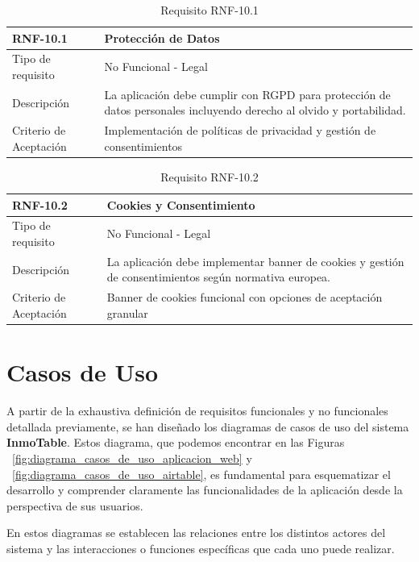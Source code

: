 
\begin{table}[H]
\centering
\begin{tabular}{|p{3cm}|p{10cm}|}
\hline
\rowcolor{tealblue}
{\textbf{RNF-10.1}} & {\textbf{Protección de Datos}} \\
\hline
Tipo de requisito & No Funcional - Legal \\
\hline
Descripción & La aplicación debe cumplir con RGPD para protección de datos personales incluyendo derecho al olvido y portabilidad. \\
\hline
Criterio de Aceptación & Implementación de políticas de privacidad y gestión de consentimientos \\
\hline
\end{tabular}
\caption{Requisito RNF-10.1}
\end{table}

\begin{table}[H]
\centering
\begin{tabular}{|p{3cm}|p{10cm}|}
\hline
\rowcolor{tealblue}
{\textbf{RNF-10.2}} & {\textbf{Cookies y Consentimiento}} \\
\hline
Tipo de requisito & No Funcional - Legal \\
\hline
Descripción & La aplicación debe implementar banner de cookies y gestión de consentimientos según normativa europea. \\
\hline
Criterio de Aceptación & Banner de cookies funcional con opciones de aceptación granular \\
\hline
\end{tabular}
\caption{Requisito RNF-10.2}
\end{table}


\section{Casos de Uso}


A partir de la exhaustiva definición de requisitos funcionales y no funcionales detallada previamente, se han diseñado los diagramas de casos de uso del sistema \textbf{InmoTable}. Estos diagrama, que podemos encontrar en las Figuras ~\ref{fig:diagrama_casos_de_uso_aplicacion_web} y ~\ref{fig:diagrama_casos_de_uso_airtable}, es fundamental para esquematizar el desarrollo y comprender claramente las funcionalidades de la aplicación desde la perspectiva de sus usuarios.

En estos diagramas se establecen las relaciones entre los distintos actores del sistema y las interacciones o funciones específicas que cada uno puede realizar.

